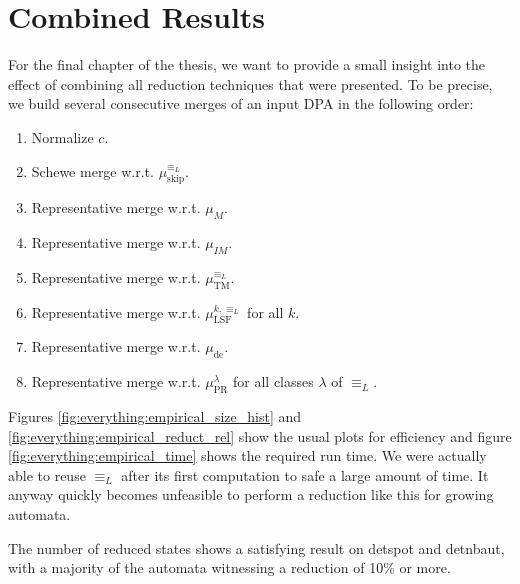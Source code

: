 
\chapter{Combined Results}
\label{chap:everything}

For the final chapter of the thesis, we want to provide a small insight into the effect of combining all reduction techniques that were presented. To be precise, we build several consecutive merges of an input DPA in the following order:
\begin{enumerate}
	\item Normalize $c$.
	\item Schewe merge w.r.t. $\mu_\text{skip}^{\equiv_L}$.
	\item Representative merge w.r.t. $\mu_M$.
	\item Representative merge w.r.t. $\mu_{IM}$.
	\item Representative merge w.r.t. $\mu_\text{TM}^{\equiv_L}$.
	\item Representative merge w.r.t. $\mu_\text{LSF}^{k,\equiv_L}$ for all $k$.
	\item Representative merge w.r.t. $\mu_\text{de}$.
	\item Representative merge w.r.t. $\mu_\text{PR}^\lambda$ for all classes $\lambda$ of $\equiv_L$.
\end{enumerate}

Figures \ref{fig:everything:empirical_size_hist} and \ref{fig:everything:empirical_reduct_rel} show the usual plots for efficiency and figure \ref{fig:everything:empirical_time} shows the required run time. We were actually able to reuse $\equiv_L$ after its first computation to safe a large amount of time. It anyway quickly becomes unfeasible to perform a reduction like this for growing automata.

The number of reduced states shows a satisfying result on \textsf{detspot} and \textsf{detnbaut}, with a majority of the automata witnessing a reduction of 10\% or more.



